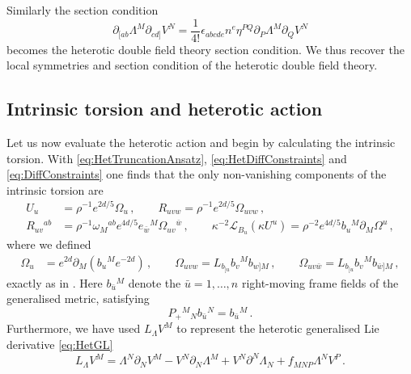 \documentclass{PoS}
\newcommand{\gL}{\mathcal{L}}
\begin{document}
Similarly the section condition
\begin{equation}
 \partial_{[ab} \Lambda^M \partial_{cd]} V^N = \frac{1}{4!} \epsilon_{abcde} n^e \eta^{PQ} \partial_P \Lambda^M \partial_Q V^N
\end{equation}
becomes the heterotic double field theory section condition. We thus recover the local symmetries and section condition of the heterotic double field theory.

\subsection{Intrinsic torsion and heterotic action}
Let us now evaluate the heterotic action and begin by calculating the intrinsic torsion. With \eqref{eq:HetTruncationAnsatz}, \eqref{eq:HetDiffConstraints} and \eqref{eq:DiffConstraints} one finds that the only non-vanishing components of the intrinsic torsion are
\begin{equation}
 \begin{split}
  U_u &= \rho^{-1} e^{2d/5} \Omega_u \,, \qquad R_{uvw} = \rho^{-1} e^{2d/5} \Omega_{uvw} \,, \\
  R_{uv}{}^{ab} &= \rho^{-1} \omega_M{}^{ab} e^{4d/5} e_{\bar{w}}{}^M \Omega_{uv}{}^{\bar{w}} \,, \qquad \kappa^{-2} \gL_{B_u} \left(\kappa U^u \right) = \rho^{-2} e^{4d/5} b_u{}^M \partial_M \Omega^u \,,
 \end{split}
\end{equation}
where we defined
\begin{equation}
 \begin{split}
  \Omega_u &= e^{2d} \partial_M \left( b_u{}^M e^{-2d} \right) \,, \qquad \Omega_{uvw} = L_{b_{[u}} b_v{}^M b_{w]M} \,, \qquad \Omega_{uv\bar{w}} = L_{b_{[u}} b_v{}^M b_{\bar{w}]M} \,,
 \end{split}
\end{equation}
exactly as in \cite{Hohm:2010xe}. Here $b_{\bar{u}}{}^M$ denote the $\bar{u} = 1, \ldots, n$ right-moving frame fields of the generalised metric, satisfying
\begin{equation}
 P_+{}^M{}_N b_{\bar{u}}{}^N = b_{\bar{u}}{}^M \,.
\end{equation}
Furthermore, we have used $L_\Lambda V^M$ to represent the heterotic generalised Lie derivative \eqref{eq:HetGL}
\begin{equation}
 L_{\Lambda} V^M = \Lambda^N \partial_N V^M - V^N \partial_N \Lambda^M + V^N \partial^N \Lambda_N + f_{MNP} \Lambda^N V^P \,. \label{eq:HetGL2}
\end{equation}
\end{document}
